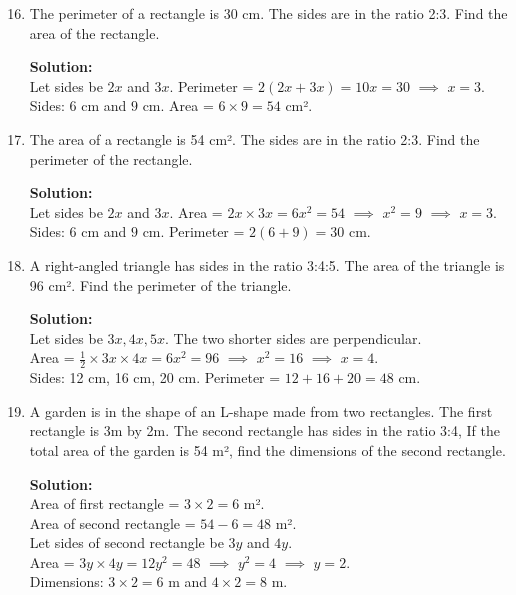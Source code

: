 \documentclass[12pt,a4paper]{article}
\begin{document}
\begin{enumerate}
\setcounter{enumi}{15}

\item The perimeter of a rectangle is 30 cm. The sides are in the ratio 2:3. Find the area of the rectangle.

\textbf{Solution:}\\
Let sides be \( 2x \) and \( 3x \). Perimeter = \( 2(2x+3x) = 10x = 30 \) \( \implies \) \( x = 3 \).\\
Sides: \( 6 \) cm and \( 9 \) cm. Area = \( 6 \times 9 = 54 \) cm².

\item The area of a rectangle is 54 cm². The sides are in the ratio 2:3. Find the perimeter of the rectangle.

\textbf{Solution:}\\
Let sides be \( 2x \) and \( 3x \). Area = \( 2x \times 3x = 6x^2 = 54 \) \( \implies \) \( x^2 = 9 \) \( \implies \) \( x = 3 \).\\
Sides: \( 6 \) cm and \( 9 \) cm. Perimeter = \( 2(6+9) = 30 \) cm.

\item A right-angled triangle has sides in the ratio 3:4:5. The area of the triangle is 96 cm². Find the perimeter of the triangle.

\textbf{Solution:}\\
Let sides be \( 3x, 4x, 5x \). The two shorter sides are perpendicular.\\
Area = \( \frac{1}{2} \times 3x \times 4x = 6x^2 = 96 \) \( \implies \) \( x^2 = 16 \) \( \implies \) \( x = 4 \).\\
Sides: 12 cm, 16 cm, 20 cm. Perimeter = \( 12+16+20 = 48 \) cm.

\item A garden is in the shape of an L-shape made from two rectangles. The first rectangle is 3m by 2m. The second rectangle has sides in the ratio 3:4, If the total area of the garden is 54 m², find the dimensions of the second rectangle.

\textbf{Solution:}\\
Area of first rectangle = \( 3 \times 2 = 6 \) m².\\
Area of second rectangle = \( 54 - 6 = 48 \) m².\\
Let sides of second rectangle be \( 3y \) and \( 4y \).\\
Area = \( 3y \times 4y = 12y^2 = 48 \) \( \implies \) \( y^2 = 4 \) \( \implies \) \( y = 2 \).\\
Dimensions: \( 3 \times 2 = 6 \) m and \( 4 \times 2 = 8 \) m.


\end{enumerate}
\end{document}
